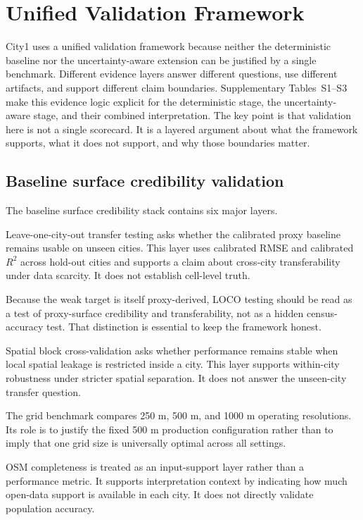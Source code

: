 \section{Unified Validation Framework}

City1 uses a unified validation framework because neither the deterministic baseline nor the uncertainty-aware extension can be justified by a single benchmark. Different evidence layers answer different questions, use different artifacts, and support different claim boundaries. Supplementary Tables~S1--S3 make this evidence logic explicit for the deterministic stage, the uncertainty-aware stage, and their combined interpretation. The key point is that validation here is not a single scorecard. It is a layered argument about what the framework supports, what it does not support, and why those boundaries matter.

\subsection{Baseline surface credibility validation}

The baseline surface credibility stack contains six major layers.

Leave-one-city-out transfer testing asks whether the calibrated proxy baseline remains usable on unseen cities. This layer uses calibrated RMSE and calibrated $R^2$ across hold-out cities and supports a claim about cross-city transferability under data scarcity. It does not establish cell-level truth.

Because the weak target is itself proxy-derived, LOCO testing should be read as a test of proxy-surface credibility and transferability, not as a hidden census-accuracy test. That distinction is essential to keep the framework honest.

Spatial block cross-validation asks whether performance remains stable when local spatial leakage is restricted inside a city. This layer supports within-city robustness under stricter spatial separation. It does not answer the unseen-city transfer question.

The grid benchmark compares 250 m, 500 m, and 1000 m operating resolutions. Its role is to justify the fixed 500 m production configuration rather than to imply that one grid size is universally optimal across all settings.

OSM completeness is treated as an input-support layer rather than a performance metric. It supports interpretation context by indicating how much open-data support is available in each city. It does not directly validate population accuracy.

